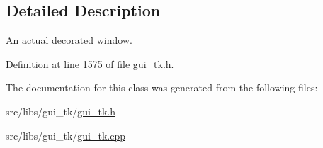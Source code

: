 \subsection{Detailed Description}
An actual decorated window. 

Definition at line 1575 of file gui\-\_\-tk.\-h.



The documentation for this class was generated from the following files\-:\begin{DoxyCompactItemize}
\item 
src/libs/gui\-\_\-tk/\hyperlink{gui__tk_8h}{gui\-\_\-tk.\-h}\item 
src/libs/gui\-\_\-tk/\hyperlink{gui__tk_8cpp}{gui\-\_\-tk.\-cpp}\end{DoxyCompactItemize}
